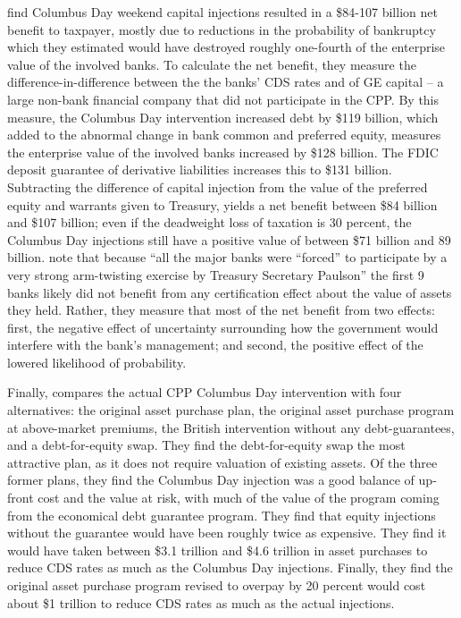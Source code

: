 \documentclass[12pt]{article}
\begin{document}
\citet{Gift} find Columbus Day weekend capital injections resulted in a \$84-107 billion net benefit to taxpayer, mostly due to reductions in the probability of bankruptcy which they estimated would have destroyed roughly one-fourth of the enterprise value of the involved banks. To calculate the net benefit, they measure the difference-in-difference between the the banks' CDS rates and of GE capital -- a large non-bank financial company that did not participate in the CPP. By this measure, the Columbus Day intervention increased debt by \$119 billion, which added to the abnormal change in bank common and preferred equity, measures the enterprise value of the involved banks increased by \$128 billion. The FDIC deposit guarantee of derivative liabilities increases this to \$131 billion. Subtracting the difference of capital injection from the value of the preferred equity and warrants given to Treasury, yields a net benefit between \$84 billion and \$107 billion; even if the deadweight loss of taxation is 30 percent, the Columbus Day injections still have a positive value of between \$71 billion and 89 billion. \citet{Gift} note that because ``all the major banks were ``forced'' to participate by a very strong arm-twisting exercise by Treasury Secretary Paulson'' the first 9 banks likely did not benefit from any certification effect about the value of assets they held. Rather, they measure that most of the net benefit from two effects: first, the negative effect of uncertainty surrounding how the government would interfere with the bank's management; and second, the positive effect of the lowered likelihood of probability. 

Finally, \citet{Gift} compares the actual CPP Columbus Day intervention with four alternatives: the original asset purchase plan, the original asset purchase program at above-market premiums, the British intervention without any debt-guarantees, and a debt-for-equity swap. They find the debt-for-equity swap the most attractive plan, as it does not require valuation of existing assets. Of the three former plans, they find the Columbus Day injection was a good balance of up-front cost and the value at risk, with much of the value of the program coming from the economical debt guarantee program. They find that equity injections without the guarantee would have been roughly twice as expensive. They find it would have taken between \$3.1 trillion and \$4.6 trillion in asset purchases to reduce CDS rates as much as the Columbus Day injections. Finally, they find the original asset purchase program revised to overpay by 20 percent would cost about \$1 trillion to reduce CDS rates as much as the actual injections. 
\end{document}
